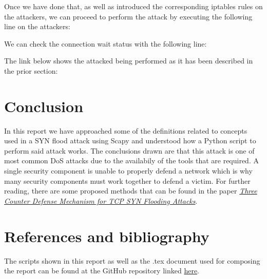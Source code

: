 \documentclass[11pt]{article}
\begin{document}
Once we have done that, as well as introduced the corresponding iptables rules on the attackers, we can proceed to perform the attack by executing the following line on the attackers:
\begin{center}
	\texttt{}
\end{center}\vspace{5mm}

We can check the connection wait status with the following line:
\begin{center}
	\texttt{}
\end{center}\vspace{5mm}

The link below shows the attacked being performed as it has been described in the prior section:
\begin{center}
	\texttt{}
\end{center}

\section{Conclusion}
In this report we have approached some of the definitions related to concepts used in a SYN flood attack using Scapy and understood how a Python script to perform said attack works. The conclusions drawn are that this attack is one of most common DoS attacks due to the availabily of the tools that are required. A single security component is unable to properly defend a network which is why many security components must work together to defend a victim. For further reading, there are some proposed methods that can be found in the paper \emph{\href{http://citeseerx.ist.psu.edu/viewdoc/download?doi=10.1.1.206.5378&rep=rep1&type=pdf}{Three Counter Defense Mechanism for TCP SYN Flooding Attacks}}. 

\clearpage
\section{References and bibliography}

The scripts shown in this report as well as the .tex document used for composing the report can be found at the GitHub repository linked \href{https://github.com/beagaliana/syn-flooding-attack}{here}.\vspace{5mm}
\end{document}
